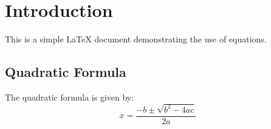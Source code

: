 \documentclass{article}
\begin{document}
\section{Introduction}
This is a simple LaTeX document demonstrating the use of equations. 

\subsection{Quadratic Formula}
The quadratic formula is given by:
\begin{equation}
x = \frac{-b \pm \sqrt{b^2 - 4ac}}{2a}
\end{equation}
\end{document}
